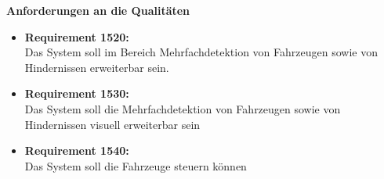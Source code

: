 \textbf{Anforderungen an die Qualit\"aten}
\begin{itemize}
\item \textbf{Requirement 1520:}\\
Das System soll im Bereich Mehrfachdetektion von Fahrzeugen sowie von Hindernissen erweiterbar sein.
\item \textbf{Requirement 1530:}\\
Das System soll die Mehrfachdetektion von Fahrzeugen sowie von Hindernissen visuell erweiterbar sein
\item \textbf{Requirement 1540:}\\
Das System soll die Fahrzeuge steuern k\"onnen
\end{itemize}